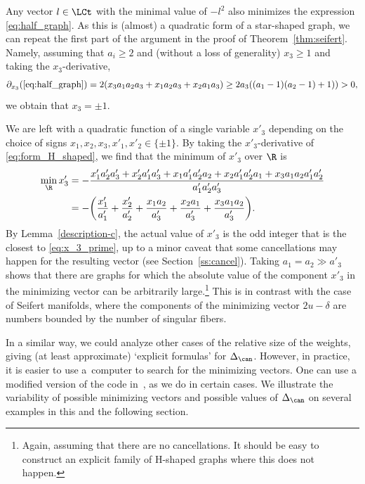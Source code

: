 \documentclass[pdftex]{sigma}
\begin{document}
Any vector $l \in \LCt$ with the minimal value of $-l^2$ also minimizes the expression \eqref{eq:half_graph}. As this is (almost) a quadratic form of a star-shaped graph, we can repeat the first part of the argument in the proof of Theorem~\ref{thm:seifert}. Namely, assuming that $a_i \geq 2$ and (without a loss of generality) $x_3 \geq 1$ and taking the $x_3$-derivative,{\samepage
\begin{align*}
\partial_{x_3}( \eqref{eq:half_graph}) = 2 (x_3 a_1 a_2 a_3 + x_1 a_2 a_3 + x_2 a_1 a_3)
 \geq 2 a_3( (a_1-1)(a_2-1) +1)) > 0,
\end{align*}
we obtain that $x_3 = \pm 1$.}

We are left with a quadratic function of a single variable $x'_3$ depending on the choice of signs $x_1,x_2,x_3,x'_1,x'_2 \in \{\pm 1\}$. By taking the $x'_3$-derivative of \eqref{eq:form_H_shaped}, we find that the minimum of $x'_3$ over $\R$ is
\begin{align}
 \min_{\R} x_3' &= -\frac{x'_1 a'_2 a'_3 + x'_2 a'_1 a'_3 + x_1 a'_1 a'_2 a_2 + x_2 a'_1 a'_2 a_1 + x_3 a_1 a_2 a'_1 a'_2}{a'_1 a'_2 a'_3} \nonumber\\
 &=-\biggl(\frac{x_1'}{a'_1}+\frac{x_2'}{a'_2}+\frac{x_1a_2}{a'_3}+\frac{x_2a_1}{a'_3}+\frac{x_3a_1 a_2}{a'_3}\biggr).\label{eq:x_3_prime}
\end{align}
By Lemma~\ref{description-c}, the actual value of $x'_3$ is the odd integer that is the closest to \eqref{eq:x_3_prime}, up to a minor caveat that some cancellations may happen for the resulting vector (see Section~\ref{ss:cancel}).
Taking $a_1=a_2 \gg a'_3$ shows that there are graphs for which the absolute value of the component $x'_3$ in the minimizing vector can be arbitrarily large.\footnote{Again, assuming that there are no cancellations. It should be easy to construct an explicit family of H-shaped graphs where this does not happen.} This is in contrast with the case of Seifert manifolds, where the components of the minimizing vector $2u-\delta$ are numbers bounded by the number of singular fibers.

In a similar way, we could analyze other cases of the relative size of the weights, giving (at least approximate) `explicit formulas' for $\Delta_{\can}$. However, in practice, it is easier to use a~computer to search for the minimizing vectors. One can use a modified version of the code in~\cite{petercode}, as we do in certain cases.
We illustrate the variability of possible minimizing vectors and possible values of $\Delta_{\can}$ on several examples in this and the following section.
\end{document}
